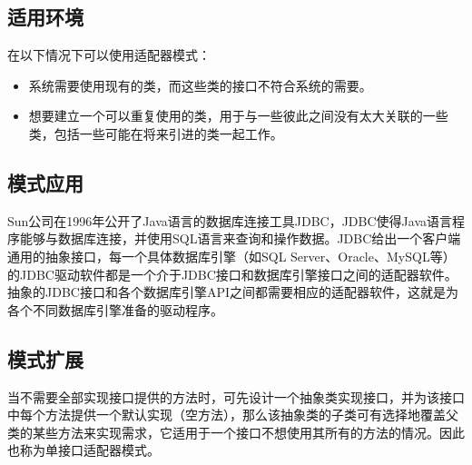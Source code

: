 \documentclass[letterpaper,10pt,english]{sphinxmanual}
\begin{document}
\subsection{适用环境}
\label{\detokenize{structural_patterns/adapter:id12}}
\sphinxAtStartPar
在以下情况下可以使用适配器模式：
\begin{itemize}
\item {} 
\sphinxAtStartPar
系统需要使用现有的类，而这些类的接口不符合系统的需要。

\item {} 
\sphinxAtStartPar
想要建立一个可以重复使用的类，用于与一些彼此之间没有太大关联的一些类，包括一些可能在将来引进的类一起工作。

\end{itemize}


\subsection{模式应用}
\label{\detokenize{structural_patterns/adapter:id13}}
\sphinxAtStartPar
Sun公司在1996年公开了Java语言的数据库连接工具JDBC，JDBC使得Java语言程序能够与数据库连接，并使用SQL语言来查询和操作数据。JDBC给出一个客户端通用的抽象接口，每一个具体数据库引擎（如SQL Server、Oracle、MySQL等）的JDBC驱动软件都是一个介于JDBC接口和数据库引擎接口之间的适配器软件。抽象的JDBC接口和各个数据库引擎API之间都需要相应的适配器软件，这就是为各个不同数据库引擎准备的驱动程序。


\subsection{模式扩展}
\label{\detokenize{structural_patterns/adapter:id14}}\begin{description}
\sphinxAtStartPar
当不需要全部实现接口提供的方法时，可先设计一个抽象类实现接口，并为该接口中每个方法提供一个默认实现（空方法），那么该抽象类的子类可有选择地覆盖父类的某些方法来实现需求，它适用于一个接口不想使用其所有的方法的情况。因此也称为单接口适配器模式。

\end{description}
\end{document}
